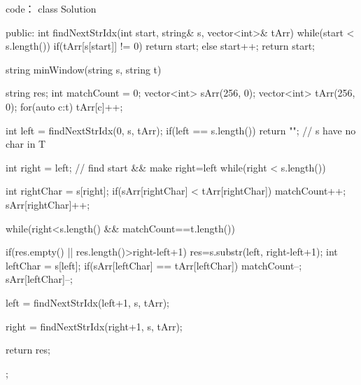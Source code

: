 code：
class Solution {
public:
    int findNextStrIdx(int start, string& s, vector<int>& tArr)
    {
        while(start < s.length())
        {
            if(tArr[s[start]] != 0) return start;
            else start++;
        }
        return start;
    }
    
    string minWindow(string s, string t) {
        string res;
        int matchCount = 0;
        vector<int> sArr(256, 0);
        vector<int> tArr(256, 0);
        for(auto c:t) tArr[c]++;
        
        int left = findNextStrIdx(0, s, tArr);
        if(left == s.length()) return ""; // s have no char in T
        
        int right = left; // find start && make right=left
        while(right < s.length())
        {
            int rightChar = s[right];
            if(sArr[rightChar] < tArr[rightChar]) matchCount++;
            sArr[rightChar]++;
            
            while(right<s.length() && matchCount==t.length())
            {
                if(res.empty() || res.length()>right-left+1) 
                    res=s.substr(left, right-left+1);
                int leftChar = s[left];
                if(sArr[leftChar] == tArr[leftChar]) matchCount--;
                sArr[leftChar]--;
                
                left = findNextStrIdx(left+1, s, tArr);
                
            }
            right = findNextStrIdx(right+1, s, tArr);
        }
        return res;
    }
};